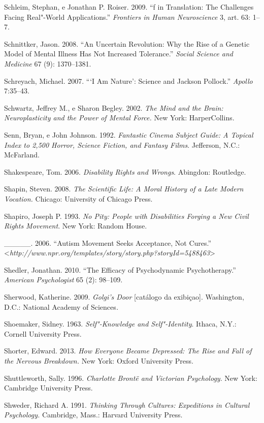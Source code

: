 {\begin{Parskip}
Schleim, Stephan, e Jonathan P. Roiser. 2009. ``f in Translation: The
Challenges Facing Real"-World Applications.'' \emph{Frontiers in Human
Neuroscience} 3, art. 63: 1--7.

Schnittker, Jason. 2008. ``An Uncertain Revolution: Why the Rise of a
Genetic Model of Mental Illness Has Not Increased Tolerance.''
\emph{Social Science and Medicine} 67 (9): 1370--1381.

Schreyach, Michael. 2007. ```I Am Nature': Science and Jackson
Pollock.'' \emph{Apollo} 7:35--43.

Schwartz, Jeffrey M., e Sharon Begley. 2002. \emph{The Mind and the
Brain: Neuroplasticity and the Power of Mental Force.} New York:
HarperCollins.

Senn, Bryan, e John Johnson. 1992. \emph{Fantastic Cinema Subject Guide:
A Topical Index to 2,500 Horror, Science Fiction, and Fantasy Films}.
Jefferson, N.C.: McFarland.

Shakespeare, Tom. 2006. \emph{Disability Rights and Wrongs}. Abingdon:
Routledge.

Shapin, Steven. 2008. \emph{The Scientific Life: A Moral History of a
Late Modern Vocation.} Chicago: University of Chicago Press.

Shapiro, Joseph P. 1993. \emph{No Pity: People with Disabilities Forging
a New Civil Rights Movement}. New York: Random House.

\_\_\_\_\_. 2006. ``Autism Movement Seeks Acceptance, Not Cures.''
\textless{}\emph{http://www.npr.org/templates/story/story.php?storyId​=5488463}\textgreater{}

Shedler, Jonathan. 2010. ``The Efficacy of Psychodynamic
Psychotherapy.'' \emph{American Psychologist} 65 (2): 98--109.

Sherwood, Katherine. 2009. \emph{Golgi's Door} {[}catálogo da
exibiçao{]}. Washington, D.C.: National Academy of Sciences\emph{.}

Shoemaker, Sidney. 1963. \emph{Self"-Knowledge and Self"-Identity}.
Ithaca, N.Y.: Cornell University Press.

Shorter, Edward. 2013. \emph{How Everyone Became Depressed: The Rise and
Fall of the Nervous Breakdown.} New York: Oxford University Press.

Shuttleworth, Sally. 1996. \emph{Charlotte Brontë and Victorian
Psychology}. New York: Cambridge University Press.

Shweder, Richard A. 1991. \emph{Thinking Through Cultures: Expeditions
in Cultural Psychology.} Cambridge, Mass.: Harvard University Press.


\end{Parskip}}
